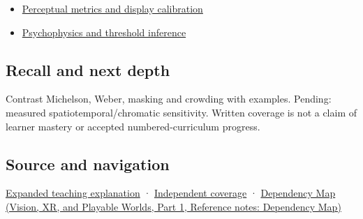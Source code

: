 \begin{itemize}
\tightlist
\item
  \hyperref[appendix-b2c1846508bf]{Perceptual metrics and display calibration}
\item
  \hyperref[appendix-1759f03e8ce7]{Psychophysics and threshold inference}
\end{itemize}

\subsection{Recall and next depth}\label{appendix-b3aa9e8e01ad-recall-and-next-depth}

\hypertarget{appendix-b3aa9e8e01ad-recall-and-next-depth}{}

Contrast Michelson, Weber, masking and crowding with examples. Pending: measured spatiotemporal/chromatic sensitivity. Written coverage is not a claim of learner mastery or accepted numbered-curriculum progress.

\subsection{Source and navigation}\label{appendix-b3aa9e8e01ad-source-and-navigation}

\hypertarget{appendix-b3aa9e8e01ad-source-and-navigation}{}

\hyperref[04-visual-computing-ii-ch042-visibility-is-about-contrast-conditions-and-tasks]{Expanded teaching explanation} · \hyperref[appendix-fd090d982a15-xr01---independent-seeing-and-representation-source]{Independent coverage} · \href{../07-Vision-XR-and-Playable-Worlds-P01/main.pdf\#appendix-4ad47bdd269a}{Dependency Map (Vision, XR, and Playable Worlds, Part 1, Reference notes: Dependency Map)}
